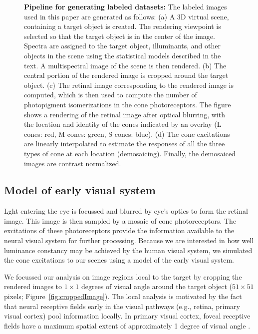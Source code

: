 \documentclass{jov}
\begin{document}
\begin{figure}
\begin{subfigure}[b]{0.2 \textwidth}
        \label{fig:coneContrast}
    \end{subfigure}
    \label{fig:sceneWithCroppedImage}
    \caption{{\bf Pipeline for generating labeled datasets:}  The labeled images used in this paper are generated as follows: (a) A 3D virtual scene, containing a target object is created. The rendering viewpoint is selected so that the target object is in the center of the image. Spectra are assigned to the target object, illuminants, and other objects in the scene using the statistical models described in the text. A multispectral image of the scene is then rendered. (b) The central portion of the rendered image is cropped around the target object. (c) The retinal image corresponding to the rendered image is computed, which is then used to compute the number of photopigment isomerizations in the cone photoreceptors. The figure shows a rendering of the retinal image after optical blurring, with the location and identity of the cones indicated by an overlay (L cones: red, M cones: green, S cones: blue).  (d) The cone excitations are linearly interpolated to estimate the responses of all the three types of cone at each location (demosaicing). Finally, the demosaiced images are contrast normalized.}
\end{figure}

\subsection{Model of early visual system} \label{method:Isetbio}
Lght entering the eye is focussed and blurred by eye's optics to form the retinal image.
This image is then sampled by a mosaic of cone photoreceptors.
The excitations of these photoreceptors provide the information available to the neural visual system for further processing.
Because we are interested in how well luminance constancy may be achieved by the human visual system, we simulated the cone excitations
to our scenes using a model of the early visual system.

We focussed our analysis on image regions local to the target by cropping the rendered images to $1 \times 1$ degrees of visual angle around the target object ($51 \times 51$ pixels; Figure~\ref{fig:croppedImage}).
The local analysis is motivated by the fact that neural receptive fields early in the visual pathways (e.g., retina, primary visual cortex) pool information locally. 
In primary visual cortex, foveal receptive fields have a maximum spatial extent of approximately 1 degree of visual angle \cite{gattass1981visual, gattass1988visuotopic}. 
\end{document}
